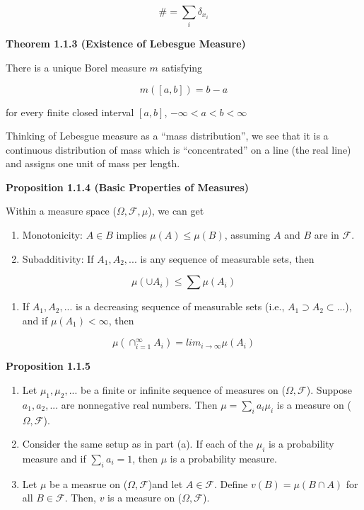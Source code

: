 \documentclass[]{book}
\providecommand{\tightlist}{%
  \setlength{\itemsep}{0pt}\setlength{\parskip}{0pt}}
\begin{document}
\[\# =\sum_i \delta_{x_i}\]

\textbf{Theorem 1.1.3 (Existence of Lebesgue Measure)}

There is a unique Borel measure \(m\) satisfying

\[m([a,b])=b-a\]

for every finite closed interval \([a,b]\), \(-\infty<a<b< \infty\)

Thinking of Lebesgue measure as a ``mass distribution'', we see that it
is a continuous distribution of mass which is ``concentrated'' on a line
(the real line) and assigns one unit of mass per length.

\textbf{Proposition 1.1.4 (Basic Properties of Measures)}

Within a measure space (\(\Omega, \mathcal{F}, \mu\)), we can get

\begin{enumerate}
\def\labelenumi{(\alph{enumi})}
\item
  Monotonicity: \(A \in B\) implies \(\mu(A) \leq \mu(B)\), assuming
  \(A\) and \(B\) are in \(\mathcal{F}\).
\item
  Subadditivity: If \(A_1, A_2,...\) is any sequence of measurable sets,
  then
\end{enumerate}

\[\mu(\cup A_i) \leq \sum \mu (A_i)\]

\begin{enumerate}
\def\labelenumi{(\alph{enumi})}
\setcounter{enumi}{2}
\tightlist
\item
  If \(A_1, A_2,...\) is a decreasing sequence of measurable sets (i.e.,
  \(A_1 \supset A_2 \subset ...\)), and if \(\mu(A_1) < \infty\), then
\end{enumerate}

\[\mu(\cap_{i=1}^\infty A_i)=lim_{i \rightarrow\infty} \mu(A_i)\]

\textbf{Proposition 1.1.5}

\begin{enumerate}
\def\labelenumi{(\alph{enumi})}
\item
  Let \(\mu_1, \mu_2,...\) be a finite or infinite sequence of measures
  on (\(\Omega, \mathcal{F}\)). Suppose \(a_1, a_2,...\) are nonnegative
  real numbers. Then \(\mu=\sum_i a_i \mu_i\) is a measure on
  (\(\Omega, \mathcal{F}\)).
\item
  Consider the same setup as in part (a). If each of the \(\mu_i\) is a
  probability measure and if \(\sum_i a_i =1\), then \(\mu\) is a
  probability measure.
\item
  Let \(\mu\) be a measrue on (\(\Omega, \mathcal{F}\))and let
  \(A \in \mathcal{F}\). Define \(v(B)=\mu(B \cap A)\) for all
  \(B \in \mathcal{F}\). Then, \(v\) is a measure on
  (\(\Omega, \mathcal{F}\)).
\end{enumerate}
\end{document}
